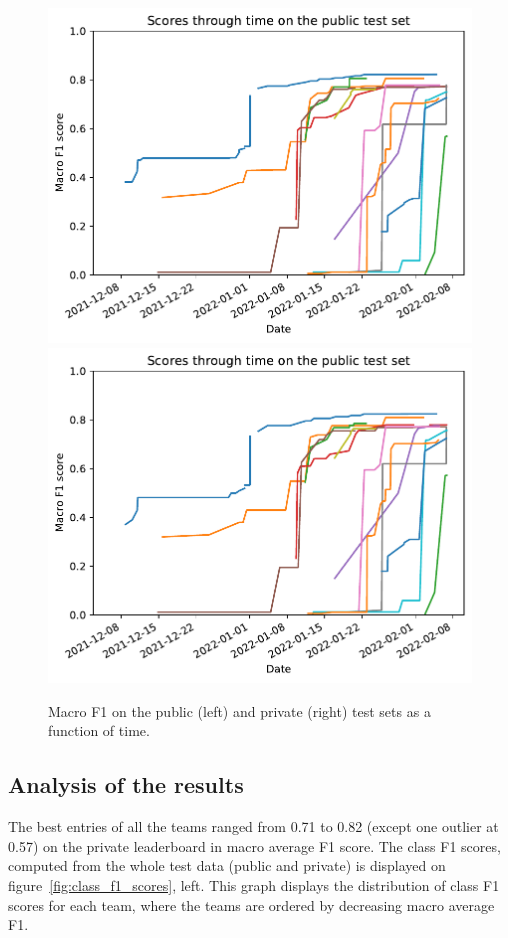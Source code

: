 \documentclass{article}
\begin{document}
\begin{figure}
	\begin{center}
		\includegraphics[width=0.45\columnwidth]{figs/public-test.pdf}
		\includegraphics[width=0.45\columnwidth]{figs/private-test.pdf}
	\end{center}
	\caption{\label{fig:F1scores} Macro F1 on the public (left) and private (right) test sets as a function of time.}
\end{figure}

\subsection{Analysis of the results}

The best entries of all the teams ranged from 0.71 to 0.82 (except one outlier at 0.57) on the private leaderboard in macro average F1 score. The class F1 scores, computed from the whole test data (public and private) is displayed on figure~\ref{fig:class_f1_scores}, left. This graph displays the distribution of class F1 scores for each team, where the teams are ordered by decreasing macro average F1.
\end{document}
